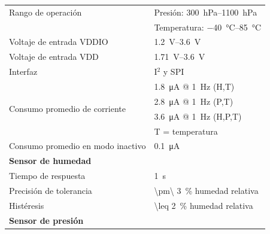 \documentclass[../main]{subfiles}
\begin{document}
\begin{table}[H]
	\centering
	\begin{tabular}{m{6cm} m{7cm}}
		\toprule
		Rango de operación                               & Presión: \qtyrange{300}{1100}{\hecto\Pa}                         \\
		                                                 & Temperatura: \qtyrange{-40}{85}{\degreeCelsius}                  \\
		\midrule
		Voltaje de entrada VDDIO                         & \qtyrange{1.2}{3.6}{\V}                                          \\
		Voltaje de entrada VDD                           & \qtyrange{1.71}{3.6}{\V}                                         \\
		\midrule
		Interfaz                                         & I$^2$ y SPI                                                      \\
		\midrule
		\multirow{4}{4cm}{Consumo promedio de corriente} & \qty{1.8}{\micro\A} @ \qty{1}{\Hz} (H,T)                         \\
		                                                 & \qty{2.8}{\micro\A} @ \qty{1}{\Hz} (P,T)                         \\
		                                                 & \qty{3.6}{\micro\A} @ \qty{1}{\Hz} (H,P,T)                       \\
		                                                 & T = temperatura                                                  \\
		\midrule
		Consumo promedio en modo inactivo                & \qty{0.1}{\micro\A}                                              \\
		\midrule
		\textbf{Sensor de humedad}                       &                                                                  \\
		Tiempo de respuesta                              & \qty{1}{\s}                                                      \\
		Precisión de tolerancia                          & \qty[parse-numbers=false]{\pm\ 3}{\percent} humedad relativa     \\
		Histéresis                                       & \qty[parse-numbers=false]{\leq 2}{\percent} humedad relativa     \\
		\midrule
		\textbf{Sensor de presión}                       &                                                                  \\

\end{tabular}
\end{table}
\end{document}
